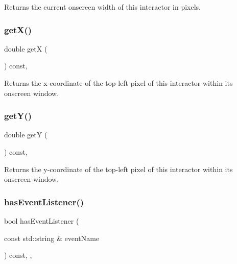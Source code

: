 Returns the current onscreen width of this interactor in pixels. 

\mbox{\label{classsgl_1_1GInteractor_a344385751bee0720059403940d57a13e}} 
\subsubsection{\texorpdfstring{get\+X()}{getX()}}
{\footnotesize\ttfamily double getX (\begin{DoxyParamCaption}{ }\end{DoxyParamCaption}) const\hspace{0.3cm}{\ttfamily [virtual]}, {\ttfamily [inherited]}}



Returns the x-\/coordinate of the top-\/left pixel of this interactor within its onscreen window. 

\mbox{\label{classsgl_1_1GInteractor_aafa51c7f8f38a09febbb9ce7853f77b4}} 
\subsubsection{\texorpdfstring{get\+Y()}{getY()}}
{\footnotesize\ttfamily double getY (\begin{DoxyParamCaption}{ }\end{DoxyParamCaption}) const\hspace{0.3cm}{\ttfamily [virtual]}, {\ttfamily [inherited]}}



Returns the y-\/coordinate of the top-\/left pixel of this interactor within its onscreen window. 

\mbox{\label{classsgl_1_1GObservable_a9f6faaa25942923bafa1c44020c49fa9}} 
\subsubsection{\texorpdfstring{has\+Event\+Listener()}{hasEventListener()}}
{\footnotesize\ttfamily bool has\+Event\+Listener (\begin{DoxyParamCaption}\item[{const std\+::string \&}]{event\+Name }\end{DoxyParamCaption}) const\hspace{0.3cm}{\ttfamily [protected]}, {\ttfamily [virtual]}, {\ttfamily [inherited]}}



